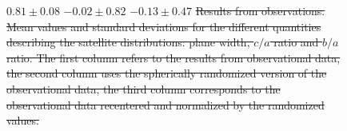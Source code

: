 \documentclass[a4paper,fleqn,usenatbib]{mnras}
\providecommand{\DIFdeltex}[1]{{\protect\color{red}\sout{#1}}}                      %
\providecommand{\DIFdelFL}[1]{\DIFdel{#1}} %
\providecommand{\DIFdel}[1]{\texorpdfstring{\DIFdeltex{#1}}{}} %
\begin{document}
\begin{figure}
\DIFdelFL{$0.81\pm 0.08$ }%
\DIFdelFL{$-0.02\pm 0.82$ }%
\DIFdelFL{$-0.13\pm 0.47$}%
{%
\DIFdelFL{Results from observations. Mean values and standard deviations for the different
    quantities describing the satellite distributions: plane width, $c/a$
    ratio and $b/a$ ratio. 
    The first column refers to the results from
    observational data, the second column uses the spherically
    randomized version of the observational data, the third column
    corresponds to the observational data recentered and normalized
    by the randomized values. }%
}


\end{figure}
\end{document}
